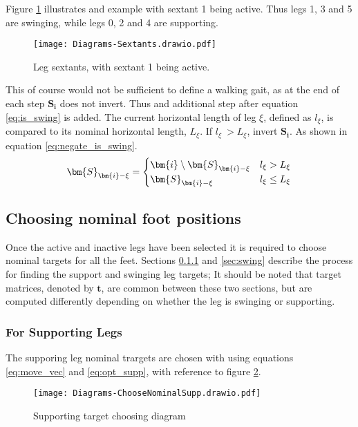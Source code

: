     Figure \ref{fig:sextants} illustrates and example with sextant 1 being active. Thus legs 1, 3 and 5 are swinging, while legs 0, 2 and 4 are supporting.
    \begin{figure}[h]
        \centering
        \hspace{1.1cm}
        \texttt{[image: Diagrams-Sextants.drawio.pdf]}
        \caption{Leg sextants, with sextant 1 being active.} 
        \label{fig:sextants}
    \end{figure}
    
    \noindent
    This of course would not be sufficient to define a walking gait, as at the end of each step \(\bm{S_i}\) does not invert.
    Thus and additional step after equation \ref{eq:is_swing} is added. The current horizontal length of leg \(\xi\), defined as \(l_\xi\), is compared to its nominal
    horizontal length, \(L_\xi\). If \(l_\xi\ > L_\xi\), invert \(\bm{S_i}\). As shown in equation \ref{eq:negate_is_swing}.
    \begin{equation} \label{eq:negate_is_swing}
        \bm{S}_{\bm{i} - \xi} =
                                            \begin{cases}
                                                \bm{i} \setminus \bm{S}_{\bm{i} - \xi} & l_\xi > L_\xi \\
                                                \bm{S}_{\bm{i} - \xi} & l_\xi \leq L_\xi
                                            \end{cases}\\[0.1cm]
    \end{equation}

    \newpage
    \subsection{Choosing nominal foot positions}    
    Once the active and inactive legs have been selected it is required to choose nominal targets for all the feet. Sections \ref{sec:support} and \ref{sec:swing}
    describe the process for finding the support and swinging leg targets; It should be noted that target matrices, denoted by \(\bm{t}\), are common between these two sections, but are computed
    differently depending on whether the leg is swinging or supporting.
        
    \subsubsection{For Supporting Legs} \label{sec:support}
        The supporing leg nominal trargets are chosen with using equations \ref{eq:move_vec} and \ref{eq:opt_supp}, with reference
        to figure \ref{fig:supp_targ}.
        \begin{figure}[h]
            \centering
            \texttt{[image: Diagrams-ChooseNominalSupp.drawio.pdf]}
            \caption{Supporting target choosing diagram} 
            \label{fig:supp_targ}
        \end{figure}

